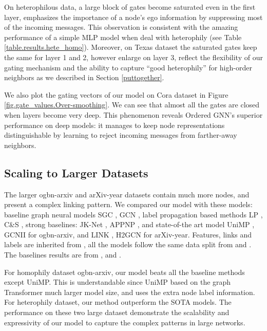 \documentclass{article}
\begin{document}
On heterophilous data, a large block of gates become saturated even in the first layer, emphasizes the importance of a node's ego information by suppressing most of the incoming messages. This observation is consistent with the amazing performance of a simple MLP model when deal with heterophily (see Table \ref{table.results.hete_homo}). Moreover, on Texas dataset the saturated gates keep the same for layer 1 and 2, however enlarge on layer 3, reflect the flexibility of our gating mechanism and the ability to capture ``good heterophily'' for high-order neighbors as we described in Section \ref{puttogether}.

We also plot the gating vectors of our model on Cora dataset in Figure \ref{fig.gate_values.Over-smoothing}. We can see that almost all the gates are closed when layers become very deep. This phenomenon reveals Ordered GNN's superior performance on deep models: it manages to keep node representations distinguishable by learning to reject incoming messages from farther-away neighbors.





\subsection{Scaling to Larger Datasets}
\label{setting_large}
The larger ogbn-arxiv and arXiv-year datasets contain much more nodes, and present a complex linking pattern. We compared our model with these models: baseline graph neural models SGC \citep{wu2019simplifying}, GCN \citep{kipf2016semi}, label propagation based methods LP \citep{zhou2003learning}, C\&S \citep{huang2020combining}, strong baselines: JK-Net \citep{xu2018representation}, APPNP \citep{klicpera2018predict}, and state-of-the art model UniMP \citep{shi2020masked}, 
GCNII \citep{chen2020simple} for ogbn-arxiv, and LINK \citep{lim2021new}, H2GCN \citep{zhu2020beyond} for arXiv-year. Features, links and labels are inherited from \citet{hu2020open}, all the models follow the same data split from \citet{hu2020open} and \citet{lim2021new}. The baselines results are from \citet{lim2021new}, \citet{li2020deepergcn} and \citet{huang2020combining}.

For homophily dataset ogbn-arxiv, our model beats all the baseline methods except UniMP. This is understandable since UniMP based on the graph Transformer much larger model size, and uses the extra node label information. For heterophily dataset, our method outperform the SOTA models. The performance on these two large dataset demonstrate the scalability and expressivity of our model to capture the complex patterns in large networks.
\end{document}
